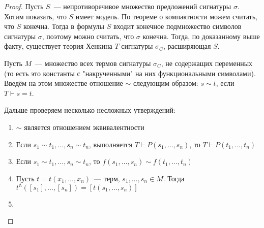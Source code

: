 \begin{proof}
    Пусть $S$~— непротиворечивое множество предложений сигнатуры $\sigma$. Хотим показать, что $S$ имеет модель. По теореме о компактности можем считать, что $S$ конечна. Тогда в формулы $S$ входит конечное подмножество символов сигнатуры $\sigma$, поэтому можно считать, что $\sigma$ конечна. Тогда, по доказанному выше факту, существует теория Хенкина $T$ сигнатуры $\sigma_C$, расширяющая $S$.

    Пусть $M$~— множество всех термов сигнатуры $\sigma_C$, не содержащих переменных (то есть это константы с "накрученными" на них функциональными символами). Введём на этом множестве отношение $\sim$ следующим образом: $s\sim t$, если $T\vdash s=t$.

    Дальше проверяем несколько несложных утверждений:
    \begin{enumerate}
        \item $\sim$ является отношением эквивалентности
        \item Если $s_1\sim t_1, \ldots, s_n\sim t_n$, выполняется $T\vdash P(s_1, \ldots, s_n)$, то $T\vdash P(t_1, \ldots, t_n)$
        \item Если $s_1\sim t_1, \ldots, s_n\sim t_n$, то $f(s_1, \ldots, s_n)\sim f(t_1, \ldots, t_n)$
        \item Пусть $t = t(x_1, \ldots, x_n)$~— терм, $s_1, \ldots, s_n\in M$. Тогда $t^\mathbb{A}([s_1], \ldots, [s_n]) = [t(s_1, \ldots, s_n)]$
        \item %
    \end{enumerate}
\end{proof}
